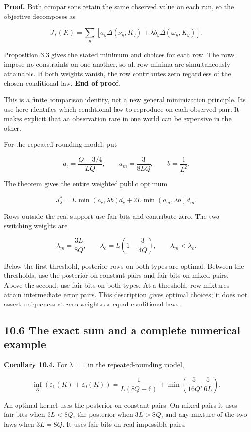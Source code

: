 \documentclass[
]{article}
\begin{document}
\textbf{Proof.} Both comparisons retain the same observed value on each
run, so the objective decomposes as

\[
J_\lambda(K)=\sum_y
\left[a_y\Delta(\nu_y,K_y)+\lambda b_y\Delta(\omega_y,K_y)\right].
\]

Proposition 3.3 gives the stated minimum and choices for each row. The
rows impose no constraints on one another, so all row minima are
simultaneously attainable. If both weights vanish, the row contributes
zero regardless of the chosen conditional law. \textbf{End of proof.}

This is a finite comparison identity, not a new general minimization
principle. Its use here identifies which conditional law to reproduce on
each observed pair. It makes explicit that an observation rare in one
world can be expensive in the other.

For the repeated-rounding model, put

\[
a_c=\frac{Q-3/4}{LQ},\qquad
a_m=\frac3{8LQ},\qquad b=\frac1{L^2}.
\]

The theorem gives the entire weighted public optimum

\[
J_\lambda^*=L\min(a_c,\lambda b)d_c
+2L\min(a_m,\lambda b)d_m.
\]

Rows outside the real support use fair bits and contribute zero. The two
switching weights are

\[
\lambda_m=\frac{3L}{8Q},\qquad
\lambda_c=L\left(1-\frac3{4Q}\right),\qquad
\lambda_m<\lambda_c.
\]

Below the first threshold, posterior rows on both types are optimal.
Between the thresholds, use the posterior on constant pairs and fair
bits on mixed pairs. Above the second, use fair bits on both types. At a
threshold, row mixtures attain intermediate error pairs. This
description gives optimal choices; it does not assert uniqueness at zero
weights or equal conditional laws.

\subsection{10.6 The exact sum and a complete numerical
example}\label{the-exact-sum-and-a-complete-numerical-example}

\textbf{Corollary 10.4.} For \(\lambda=1\) in the repeated-rounding
model,

\[
\inf_K(\varepsilon_1(K)+\varepsilon_0(K))
=\frac1{L(8Q-6)}+
\min\left(\frac5{16Q},\frac5{6L}\right).
\]

An optimal kernel uses the posterior on constant pairs. On mixed pairs
it uses fair bits when \(3L<8Q\), the posterior when \(3L>8Q\), and any
mixture of the two laws when \(3L=8Q\). It uses fair bits on
real-impossible pairs.
\end{document}
